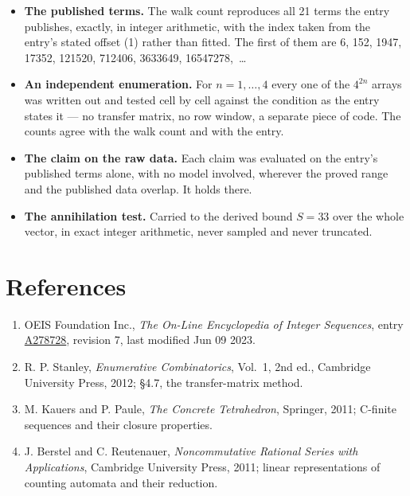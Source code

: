 \documentclass[11pt]{article}
\theoremstyle{definition}
\begin{document}
\begin{itemize}

\item {\bfseries The published terms.} The walk count reproduces all 21 terms the entry publishes, exactly, in integer arithmetic, with the index taken from the entry's stated offset (1) rather than fitted. The first of them are 6, 152, 1947, 17352, 121520, 712406, 3633649, 16547278,~\dots

\item {\bfseries An independent enumeration.} For $n = 1,\dots,4$ every one of the $4^{2n}$ arrays was written out and tested cell by cell against the condition as the entry states it --- no transfer matrix, no row window, a separate piece of code. The counts agree with the walk count and with the entry.

\item {\bfseries The claim on the raw data.} Each claim was evaluated on the entry's published terms alone, with no model involved, wherever the proved range and the published data overlap. It holds there.

\item {\bfseries The annihilation test.} Carried to the derived bound $S = 33$ over the whole vector, in exact integer arithmetic, never sampled and never truncated.

\end{itemize}

\section{References}

\begin{enumerate}

\item OEIS Foundation Inc., \emph{The On-Line Encyclopedia of Integer Sequences}, entry \href{https://oeis.org/A278728}{A278728}, revision 7, last modified Jun 09 2023.

\item R. P. Stanley, \emph{Enumerative Combinatorics}, Vol.~1, 2nd ed., Cambridge University Press, 2012; \S4.7, the transfer-matrix method.

\item M. Kauers and P. Paule, \emph{The Concrete Tetrahedron}, Springer, 2011; C-finite sequences and their closure properties.

\item J. Berstel and C. Reutenauer, \emph{Noncommutative Rational Series with Applications}, Cambridge University Press, 2011; linear representations of counting automata and their reduction.

\end{enumerate}
\end{document}
